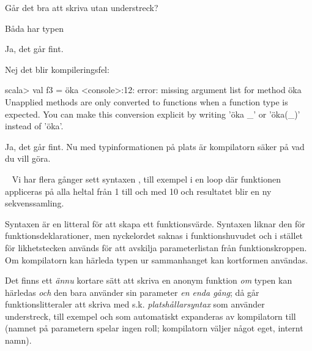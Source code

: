\Subtask Går det bra att skriva  utan understreck?

\SOLUTION

\TaskSolved \what

\SubtaskSolved

\begin{ConceptConnections}
  
\end{ConceptConnections}

\SubtaskSolved Båda har typen 

\SubtaskSolved  Ja, det går fint.

\SubtaskSolved  Nej det blir kompileringsfel: \\
\begin{REPL}
scala> val f3 = öka
<console>:12: error: missing argument list for method öka
Unapplied methods are only converted to functions when
a function type is expected. You can make this conversion
explicit by writing 'öka _' or 'öka(_)' instead of 'öka'.
\end{REPL}

\SubtaskSolved  Ja, det går fint. Nu med typinformationen på plats är kompilatorn säker på vad du vill göra.

\QUESTEND





\QUESTBEGIN

\Task  \what~  Vi har flera gånger sett syntaxen , till exempel i en loop  där funktionen  appliceras på alla heltal från 1 till och med 10 och resultatet blir en ny sekvenssamling.

Syntaxen  är en litteral för att skapa ett funktionsvärde. Syntaxen liknar den för funktionsdeklarationer, men nyckelordet  saknas i funktionshuvudet och i stället för likhetstecken används \code{=>} för att avskilja parameterlistan från funktionskroppen.
Om kompilatorn kan härleda typen ur sammanhanget kan kortformen  användas.

Det finns ett \emph{ännu} kortare sätt att skriva en anonym funktion \emph{om} typen kan härledas \emph{och} den bara använder sin parameter \emph{en enda gång}; då går funktionslitteraler att skriva med s.k. \emph{platshållarsyntax} som använder understreck, till exempel  och som automatiskt expanderas av kompilatorn till  (namnet på parametern spelar ingen roll; kompilatorn väljer något eget, internt namn).

